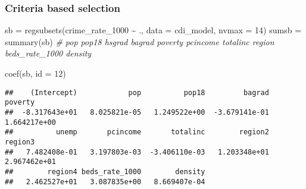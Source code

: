 \documentclass[
  11pt,
]{article}
\newenvironment{Shaded}{\begin{snugshade}}{\end{snugshade}}
\newcommand{\AttributeTok}[1]{\textcolor[rgb]{0.77,0.63,0.00}{#1}}
\newcommand{\CommentTok}[1]{\textcolor[rgb]{0.56,0.35,0.01}{\textit{#1}}}
\newcommand{\DecValTok}[1]{\textcolor[rgb]{0.00,0.00,0.81}{#1}}
\newcommand{\FunctionTok}[1]{\textcolor[rgb]{0.00,0.00,0.00}{#1}}
\newcommand{\NormalTok}[1]{#1}
\newcommand{\OtherTok}[1]{\textcolor[rgb]{0.56,0.35,0.01}{#1}}
\newcommand{\SpecialCharTok}[1]{\textcolor[rgb]{0.00,0.00,0.00}{#1}}
\newcommand{\StringTok}[1]{\textcolor[rgb]{0.31,0.60,0.02}{#1}}
\begin{document}
\hypertarget{criteria-based-selection}{%
\subsubsection{Criteria based
selection}\label{criteria-based-selection}}

\begin{Shaded}
\begin{Highlighting}[]
\NormalTok{sb }\OtherTok{=} \FunctionTok{regsubsets}\NormalTok{(crime\_rate\_1000 }\SpecialCharTok{\textasciitilde{}}\NormalTok{ ., }\AttributeTok{data =}\NormalTok{ cdi\_model, }\AttributeTok{nvmax =} \DecValTok{14}\NormalTok{)}
\NormalTok{sumsb }\OtherTok{=} \FunctionTok{summary}\NormalTok{(sb) }\CommentTok{\# pop pop18 hsgrad bagrad poverty pcincome totalinc region beds\_rate\_1000 density}
\end{Highlighting}
\end{Shaded}

\begin{Shaded}
\begin{Highlighting}[]
\FunctionTok{coef}\NormalTok{(sb, }\AttributeTok{id =} \DecValTok{12}\NormalTok{)}
\end{Highlighting}
\end{Shaded}

\begin{verbatim}
##    (Intercept)            pop          pop18         bagrad        poverty 
##  -8.317643e+01   8.025821e-05   1.249522e+00  -3.679141e-01   1.664217e+00 
##          unemp       pcincome       totalinc        region2        region3 
##   7.482408e-01   3.197803e-03  -3.406110e-03   1.203348e+01   2.967462e+01 
##        region4 beds_rate_1000        density 
##   2.462527e+01   3.087835e+00   8.669407e-04
\end{verbatim}

\begin{Shaded}
\end{Shaded}
\end{document}
